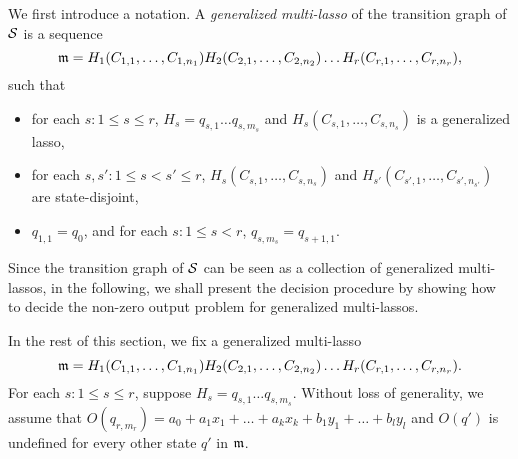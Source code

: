 We first introduce a notation. A \emph{generalized multi-lasso} of the transition graph of ${\mathcal{S} }$ is a sequence 
\[
\mathfrak{m}= H_1 (C_{1,1},\dots,C_{1,n_1}) H_2 (C_{2,1},\dots,C_{2,n_2}) \dots H_r (C_{r,1},\dots, C_{r, n_r}),
\]
such that 
\begin{itemize}
\item for each $s: 1 \le s \le r$, $H_s = q_{s,1} \dots q_{s, m_s}$ and $H_s (C_{s,1},\dots,C_{s, n_s})$ is a generalized lasso, 

\item for each $s, s': 1 \le s < s' \le r$, $H_s (C_{s,1},\dots,C_{s, n_s})$ and $H_{s'} (C_{s', 1},\dots,C_{s', n_{s'}})$ are state-disjoint,

\item $q_{1,1}=q_0$, and for each $s: 1 \le s < r$, $q_{s, m_s}=q_{s+1,1}$.
\end{itemize}

Since the transition graph of ${\mathcal{S} }$ can be seen as a collection of generalized multi-lassos, in the following, we shall present the decision procedure by showing how to decide the non-zero output problem for generalized multi-lassos. 

In the rest of this section, we fix a generalized multi-lasso
\[
\mathfrak{m}= H_1 (C_{1,1},\dots,C_{1,n_1}) H_2 (C_{2,1},\dots,C_{2,n_2}) \dots H_r (C_{r,1},\dots, C_{r, n_r}).
\]
For each $s: 1 \le s \le r$, suppose $H_s=q_{s,1} \dots q_{s, m_s}$. Without loss of generality, we assume that $O(q_{r,m_r})=a_0+a_1 x_1 + \dots + a_k x_k + b_1 y_1  + \dots + b_l y_l$ and $O(q')$ is undefined for every other state $q'$ in $\mathfrak{m}$.



